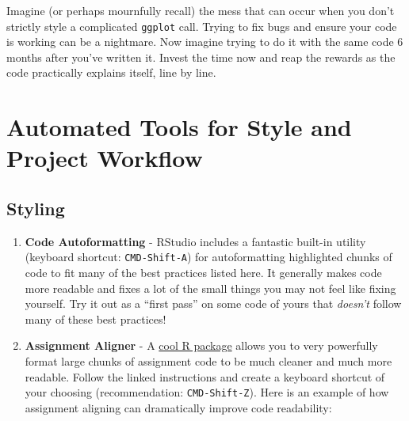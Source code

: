 \documentclass[
]{book}
\begin{document}
Imagine (or perhaps mournfully recall) the mess that can occur when you don't strictly style a complicated \texttt{ggplot} call. Trying to fix bugs and ensure your code is working can be a nightmare. Now imagine trying to do it with the same code 6 months after you've written it. Invest the time now and reap the rewards as the code practically explains itself, line by line.

\section{Automated Tools for Style and Project Workflow}\label{automated-tools-for-style-and-project-workflow}

\subsection{Styling}\label{styling}

\begin{enumerate}
\def\labelenumi{\arabic{enumi}.}
\item
  \textbf{Code Autoformatting} - RStudio includes a fantastic built-in utility (keyboard shortcut: \texttt{CMD-Shift-A}) for autoformatting highlighted chunks of code to fit many of the best practices listed here. It generally makes code more readable and fixes a lot of the small things you may not feel like fixing yourself. Try it out as a ``first pass'' on some code of yours that \emph{doesn't} follow many of these best practices!
\item
  \textbf{Assignment Aligner} - A \href{https://www.r-bloggers.com/align-assign-rstudio-addin-to-align-assignment-operators/}{cool R package} allows you to very powerfully format large chunks of assignment code to be much cleaner and much more readable. Follow the linked instructions and create a keyboard shortcut of your choosing (recommendation: \texttt{CMD-Shift-Z}). Here is an example of how assignment aligning can dramatically improve code readability:
\end{enumerate}
\end{document}
